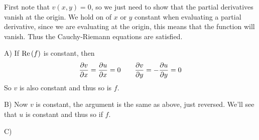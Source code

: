 \begin{exercise}
	First note that $v(x,y) = 0$, so we just need to show that the partial derivatives vanish at the origin. We hold on of $x$ or $y$ constant when evaluating a partial derivative, since we are evaluating at the origin, this means that the function will vanish. Thus the Cauchy-Riemann equations are satisfied.
	
\end{exercise}

\begin{exercise}
	A) If $\Re\left(f\right)$ is constant, then
	\[ \pdv{v}{x} = \pdv{u}{x} = 0 \qquad \pdv{v}{y} = -\pdv{u}{y} = 0 \]
	So $v$ is also constant and thus so is $f$.
	
	B) Now $v$ is constant, the argument is the same as above, just reversed. We'll see that $u$ is constant and thus so if $f$.
	
	C) 
\end{exercise}

\begin{exercise}

\end{exercise}

\begin{exercise}

\end{exercise}

\begin{exercise}

\end{exercise}

\begin{exercise}

\end{exercise}

\begin{exercise}

\end{exercise}

\begin{exercise}

\end{exercise}

\begin{exercise}

\end{exercise}

\begin{exercise}

\end{exercise}

